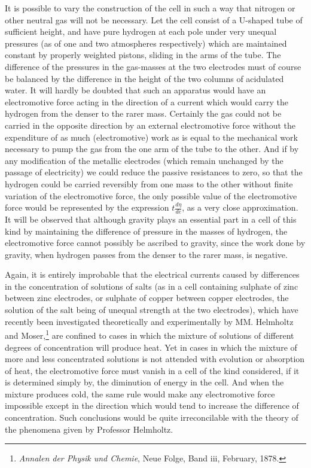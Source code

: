 \documentclass[12pt]{article}
\begin{document}
It is possible to vary the construction of the cell in such a way that nitrogen or other neutral gas will not be necessary. Let the cell consist of a U-shaped tube of sufficient height, and have pure hydrogen at each pole under very unequal pressures (as of one and two atmospheres respectively) which are maintained constant by properly weighted pistons, sliding in the arms of the tube. The difference of the pressures in the gas-masses at the two electrodes must of course be balanced by the difference in the height of the two columns of acidulated water. It will hardly be doubted that such an apparatus would have an electromotive force acting in the direction of a current which would carry the hydrogen from the denser to the rarer mass. Certainly the gas could not be carried in the opposite direction by an external electromotive force without the expenditure of as much (electromotive) work as is equal to the mechanical work necessary to pump the gas from the one arm of the tube to the other. And if by any modification of the metallic electrodes (which remain unchanged by the passage of electricity) we could reduce the passive resistances to zero, so that the hydrogen could be carried reversibly from one mass to the other without finite variation of the electromotive force, the only possible value of the electromotive force would be represented by the expression $t\frac{d\eta}{de}$, as a very close approximation. It will be observed that although gravity plays an essential part in a cell of this kind by maintaining the difference of pressure in the masses of hydrogen, the electromotive force cannot possibly be ascribed to gravity, since the work done by gravity, when hydrogen passes from the denser to the rarer mass, is negative.

Again, it is entirely improbable that the electrical currents caused by differences in the concentration of solutions of salts (as in a cell containing sulphate of zinc between zinc electrodes, or sulphate of copper between copper electrodes, the solution of the salt being of unequal strength at the two electrodes), which have recently been investigated theoretically and experimentally by MM. Helmholtz and Moser,\footnote{\textit{Annalen der Physik und Chemie}, Neue Folge, Band iii, February, 1878.} are confined to cases in which the mixture of solutions of different degrees of concentration will produce heat. Yet in cases in which the mixture of more and less concentrated solutions is not attended with evolution or absorption of heat, the electromotive force must vanish in a cell of the kind considered, if it is determined simply by, the diminution of energy in the cell. And when the mixture produces cold, the same rule would make any electromotive force impossible except in the direction which would tend to increase the difference of concentration. Such conclusions would be quite irreconcilable with the theory of the phenomena given by Professor Helmholtz.
\end{document}
